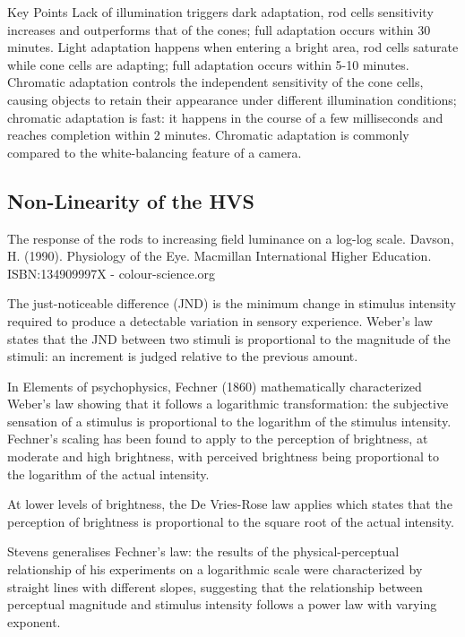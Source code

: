 Key Points
Lack of illumination triggers dark adaptation, rod cells sensitivity increases and outperforms that of the cones; full adaptation occurs within 30 minutes.
Light adaptation happens when entering a bright area, rod cells saturate while cone cells are adapting;  full adaptation occurs within 5-10 minutes.
Chromatic adaptation controls the independent sensitivity of the cone cells, causing objects to retain their appearance under different illumination conditions; chromatic adaptation is fast: it happens in the course of a few milliseconds and reaches completion within 2 minutes.
Chromatic adaptation is commonly compared to the white-balancing feature of a camera.

\subsection{Non-Linearity of the HVS}
\label{subsec:non-linearity-of-the-hvs}

The response of the rods to increasing field luminance on a log-log scale. Davson, H. (1990). Physiology of the Eye. Macmillan International Higher Education. ISBN:134909997X - colour-science.org

The just-noticeable difference (JND) is the minimum change in stimulus intensity required to produce a detectable variation in sensory experience. Weber's law states that the JND between two stimuli is proportional to the magnitude of the stimuli: an increment is judged relative to the previous amount.

In Elements of psychophysics, Fechner (1860) mathematically characterized Weber’s law showing that it follows a logarithmic transformation: the subjective sensation of a stimulus is proportional to the logarithm of the stimulus intensity. Fechner’s scaling has been found to apply to the perception of brightness, at moderate and high brightness, with perceived brightness being proportional to the logarithm of the actual intensity. 

At lower levels of brightness, the De Vries-Rose law applies which states that the perception of brightness is proportional to the square root of the actual intensity. 

Stevens generalises Fechner's law: the results of the physical-perceptual relationship of his experiments on a logarithmic scale were characterized by straight lines with different slopes, suggesting that the relationship between perceptual magnitude and stimulus intensity follows a power law with varying exponent.


